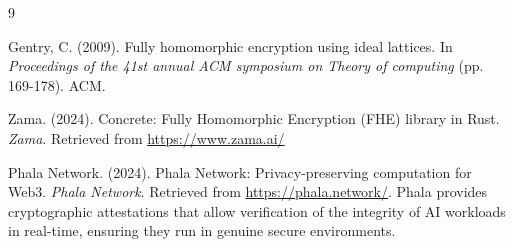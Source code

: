 \begin{thebibliography}{9}

Gentry, C. (2009). Fully homomorphic encryption using ideal lattices. In \textit{Proceedings of the 41st annual ACM symposium on Theory of computing} (pp. 169-178). ACM.

Zama. (2024). Concrete: Fully Homomorphic Encryption (FHE) library in Rust. \textit{Zama}. Retrieved from \url{https://www.zama.ai/}

Phala Network. (2024). Phala Network: Privacy-preserving computation for Web3. \textit{Phala Network}. Retrieved from \url{https://phala.network/}. Phala provides cryptographic attestations that allow verification of the integrity of AI workloads in real-time, ensuring they run in genuine secure environments.

\end{thebibliography}


